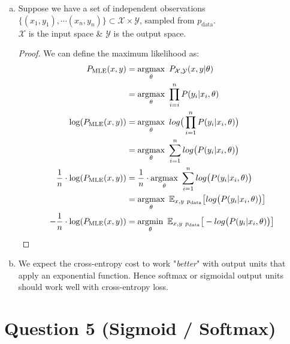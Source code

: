 \documentclass[fleqn]{article}
\DeclareMathOperator*{\argmaxfull}{argmax}
\DeclareMathOperator*{\argminfull}{argmin}
\begin{document}
\begin{enumerate}[a)]
    \item 
    Suppose we have a set of independent observations 
    $ \{(x_1, y_1), \cdots (x_n, y_n)\} \subset \mathcal{X} \times \mathcal{Y}$, sampled from $p_{\text{data}}$. \\
    $\mathcal{X}$ is the input space \& $\mathcal{Y}$ is the output space. \\
    \begin{proof}
        We can define the maximum likelihood as:
        \begin{align*}
            P_{\text{MLE}}(x, y) &= \argmaxfull_{\theta}~ P_{\mathcal{X}, \mathcal{Y}}(x, y | \theta)\\
            &= \argmaxfull_{\theta}~ \prod_{i=i}^n P(y_i | x_i, \theta) \\
            \log (P_{\text{MLE}}(x, y)) &= \argmaxfull_{\theta}~ log\big(\prod_{i=1}^n P(y_i | x_i, \theta)\big)\\
            &= \argmaxfull_{\theta}~ \sum_{i=1}^n log\big(P(y_i | x_i, \theta)\big)\\
            \frac{1}{n} \cdot \log (P_{\text{MLE}}(x, y)) &= \frac{1}{n} \cdot \argmaxfull_{\theta}~ \sum_{i=1}^n log\big(P(y_i | x_i, \theta)\big)\\
            &= \argmaxfull_{\theta}~ \mathbb{E}_{x, y ~ p_{\text{data}}}\big[log\big(P(y_i | x_i, \theta)\big)\big]\\
            -\frac{1}{n} \cdot \log (P_{\text{MLE}}(x, y)) &=  \argminfull_{\theta}~ \mathbb{E}_{x, y ~ p_{\text{data}}}\big[-log\big(P(y_i | x_i, \theta)\big)\big] \qedhere\\
        \end{align*}
    \end{proof}
   
    \item 
    We expect the cross-entropy cost to work "\textit{better}" with output units that apply an exponential function. 
    Hence softmax or sigmoidal output units should work well with cross-entropy loss.     
\end{enumerate}

\section*{Question 5 (Sigmoid / Softmax)}
\end{document}
